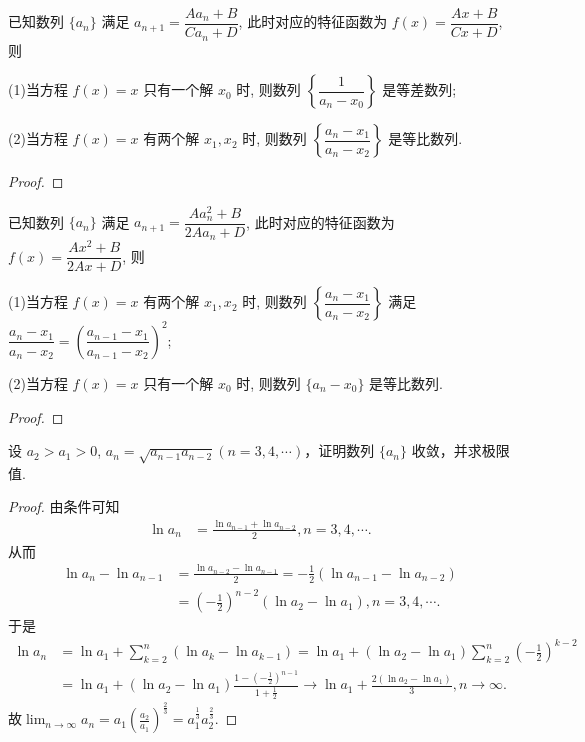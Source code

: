 \documentclass[../../main.tex]{subfiles}%
\begin{document}
\begin{proposition}\label{proposition:可直接求通项--类型三}
已知数列 $\{a_n\}$ 满足 $a_{n + 1} = \dfrac{A a_n + B}{C a_n + D}$, 此时对应的特征函数为 $f(x) = \dfrac{A x + B}{C x + D}$, 则

(1)当方程 $f(x) = x$ 只有一个解 $x_0$ 时, 则数列 $\left\{ \dfrac{1}{a_n - x_0} \right\}$ 是等差数列; 

(2)当方程 $f(x) = x$ 有两个解 $x_1, x_2$ 时, 则数列 $\left\{ \dfrac{a_n - x_1}{a_n - x_2} \right\}$ 是等比数列.
\end{proposition}
\begin{proof}



\end{proof}

\begin{proposition}\label{proposition:可直接求通项--类型四}
已知数列 $\{a_n\}$ 满足 $a_{n + 1} = \dfrac{A a_n^2 + B}{2 A a_n + D}$, 此时对应的特征函数为 $f(x) = \dfrac{A x^2 + B}{2 A x + D}$, 则

(1)当方程 $f(x) = x$ 有两个解 $x_1, x_2$ 时, 则数列 $\left\{ \dfrac{a_n - x_1}{a_n - x_2} \right\}$ 满足 $\dfrac{a_n - x_1}{a_n - x_2} = \left( \dfrac{a_{n - 1} - x_1}{a_{n - 1} - x_2} \right)^2$; 

(2)当方程 $f(x) = x$ 只有一个解 $x_0$ 时, 则数列 $\{a_n - x_0\}$ 是等比数列.
\end{proposition}
\begin{proof}



\end{proof}



\begin{example}
设 $a_2 > a_1 > 0$, $a_n = \sqrt{a_{n - 1}a_{n - 2}}(n = 3, 4, \cdots)$，证明数列 $\{a_n\}$ 收敛，并求极限值.
\end{example}
\begin{proof}

由条件可知
\begin{align*}
\ln a_n&=\frac{\ln a_{n-1}+\ln a_{n-2}}{2},n=3,4,\cdots .
\end{align*}
从而
\begin{align*}
\ln a_n-\ln a_{n-1}&=\frac{\ln a_{n-2}-\ln a_{n-1}}{2}=-\frac{1}{2}\left( \ln a_{n-1}-\ln a_{n-2} \right) 
\\
&=\left( -\frac{1}{2} \right) ^{n-2}\left( \ln a_2-\ln a_1 \right) ,n=3,4,\cdots .
\end{align*}
于是
\begin{align*}
\ln a_n&=\ln a_1+\sum_{k=2}^n{\left( \ln a_k-\ln a_{k-1} \right)}=\ln a_1+\left( \ln a_2-\ln a_1 \right) \sum_{k=2}^n{\left( -\frac{1}{2} \right) ^{k-2}}
\\
&=\ln a_1+\left( \ln a_2-\ln a_1 \right) \frac{1-\left( -\frac{1}{2} \right) ^{n-1}}{1+\frac{1}{2}}\rightarrow \ln a_1+\frac{2\left( \ln a_2-\ln a_1 \right)}{3},n\rightarrow \infty .
\end{align*}
故$\lim_{n\rightarrow \infty}a_n=a_1\left( \frac{a_2}{a_1} \right) ^{\frac{2}{3}}=a_{1}^{\frac{1}{3}}a_{2}^{\frac{2}{3}}.$

\end{proof}
\end{document}
